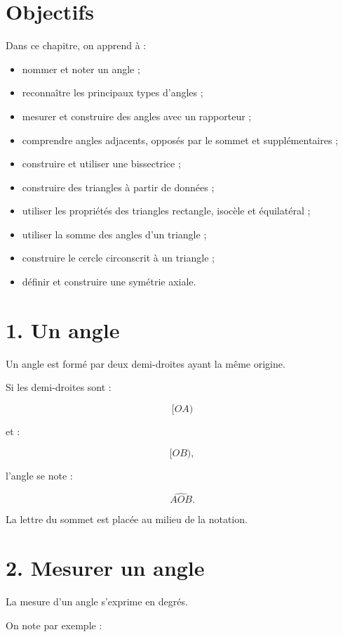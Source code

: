 
\section{Objectifs}

Dans ce chapitre, on apprend à :

\begin{itemize}
\item nommer et noter un angle ;
\item reconnaître les principaux types d’angles ;
\item mesurer et construire des angles avec un rapporteur ;
\item comprendre angles adjacents, opposés par le sommet et supplémentaires ;
\item construire et utiliser une bissectrice ;
\item construire des triangles à partir de données ;
\item utiliser les propriétés des triangles rectangle, isocèle et équilatéral ;
\item utiliser la somme des angles d’un triangle ;
\item construire le cercle circonscrit à un triangle ;
\item définir et construire une symétrie axiale.
\end{itemize}

\section{1. Un angle}

Un angle est formé par deux demi-droites ayant la même origine.

Si les demi-droites sont :

\[
[OA)
\]

et :

\[
[OB),
\]

l’angle se note :

\[
\widehat{AOB}.
\]

La lettre du sommet est placée au milieu de la notation.

\section{2. Mesurer un angle}

La mesure d’un angle s’exprime en degrés.

On note par exemple :

